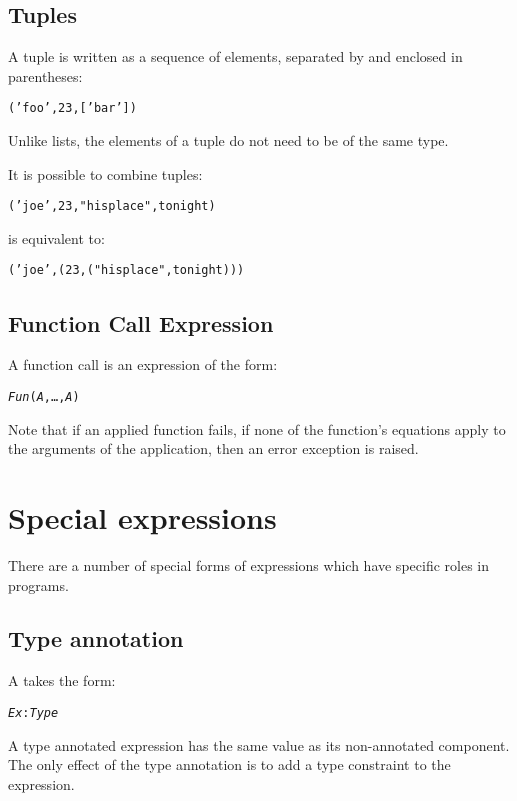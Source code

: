 \subsection{Tuples}
\label{expression:tuples}

A tuple is written as a sequence of elements, separated by \q{,} and enclosed in parentheses:
\begin{alltt}
\label{foo:bar:tuple}('foo',23,['bar'])
\end{alltt}
Unlike lists, the elements of a tuple do not need to be of the same type. 

It is possible to combine tuples:
\begin{alltt}
('joe',23,"his place",tonight)
\end{alltt}
is equivalent to:
\begin{alltt}
('joe',(23,("his place",tonight)))
\end{alltt}

\subsection{Function Call Expression}
\label{expression:applicative}

A function call is an expression of the form:
\begin{alltt}
\emph{Fun}(\emph{A},\ldots,\emph{A\subn})
\end{alltt}
Note that if an applied function fails, if none of the function's equations apply to the arguments of the application, then an  error exception is raised.

\section{Special expressions}
\label{expression:special}
There are a number of special forms of expressions which have specific roles in \go programs.

\subsection{Type annotation}
\label{expression:typeannotation}
A   takes the form:
\begin{alltt}
\emph{Ex}:\emph{Type}
\end{alltt}
A type annotated expression has the same value as its non-annotated component. The only effect of the type annotation is to add a type constraint to the expression.


